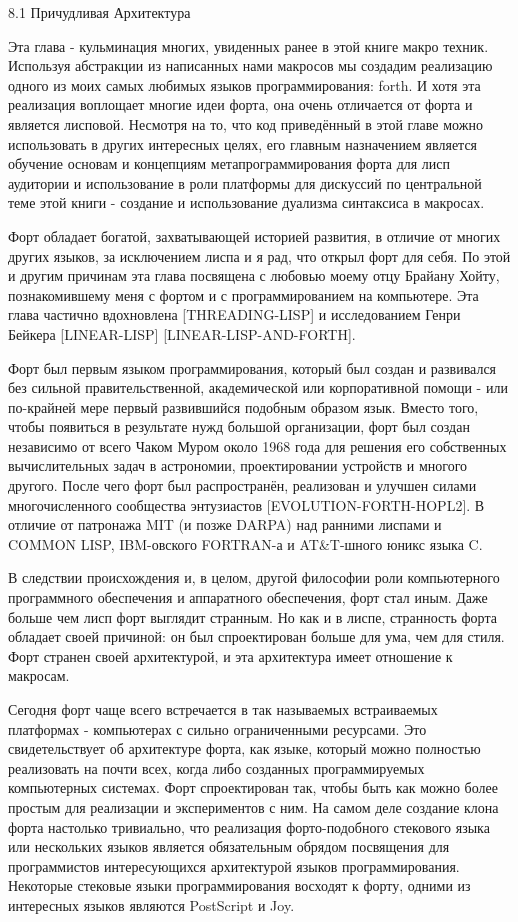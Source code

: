 8.1 Причудливая Архитектура

Эта глава - кульминация многих, увиденных ранее в этой книге макро техник. Используя абстракции из написанных нами макросов мы создадим реализацию одного из моих самых любимых языков программирования: forth. И хотя эта реализация воплощает многие идеи форта, она очень отличается от форта и является лисповой. Несмотря на то, что код приведённый в этой главе можно использовать в других интересных целях, его главным назначением является обучение основам и концепциям метапрограммирования форта для лисп аудитории и использование в роли платформы для дискуссий по центральной теме этой книги - создание и использование дуализма синтаксиса в макросах.

Форт обладает богатой, захватывающей историей развития, в отличие от многих других языков, за исключением лиспа и я рад, что открыл форт для себя. По этой и другим причинам эта глава посвящена с любовью моему отцу Брайану Хойту, познакомившему меня с фортом и с программированием на компьютере. Эта глава частично вдохновлена [THREADING-LISP] и исследованием Генри Бейкера [LINEAR-LISP] [LINEAR-LISP-AND-FORTH].

Форт был первым языком программирования, который был создан и развивался без сильной правительственной, академической или корпоративной помощи - или по-крайней мере первый развившийся подобным образом язык. Вместо того, чтобы появиться в результате нужд большой организации, форт был создан независимо от всего Чаком Муром около 1968 года для решения его собственных вычислительных задач в астрономии, проектировании устройств и многого другого. После чего форт был распространён, реализован и улучшен силами многочисленного сообщества энтузиастов [EVOLUTION-FORTH-HOPL2]. В отличие от патронажа MIT (и позже DARPA) над ранними лиспами и COMMON LISP, IBM-овского FORTRAN-а и AT\&T-шного юникс языка C.

В следствии происхождения и, в целом, другой философии роли компьютерного программного обеспечения и аппаратного обеспечения, форт стал иным. Даже больше чем лисп форт выглядит странным. Но как и в лиспе, странность форта обладает своей причиной: он был спроектирован больше для ума, чем для стиля. Форт странен своей архитектурой, и эта архитектура имеет отношение к макросам.

Сегодня форт чаще всего встречается в так называемых встраиваемых платформах - компьютерах с сильно ограниченными ресурсами. Это свидетельствует об архитектуре форта, как языке, который можно полностью реализовать на почти всех, когда либо созданных программируемых компьютерных системах. Форт спроектирован так, чтобы быть как можно более простым для реализации и экспериментов с ним. На самом деле создание клона форта настолько тривиально, что реализация форто-подобного стекового языка или нескольких языков является обязательным обрядом посвящения для программистов интересующихся архитектурой языков программирования. Некоторые стековые языки программирования восходят к форту, одними из интересных языков являются PostScript и Joy.

